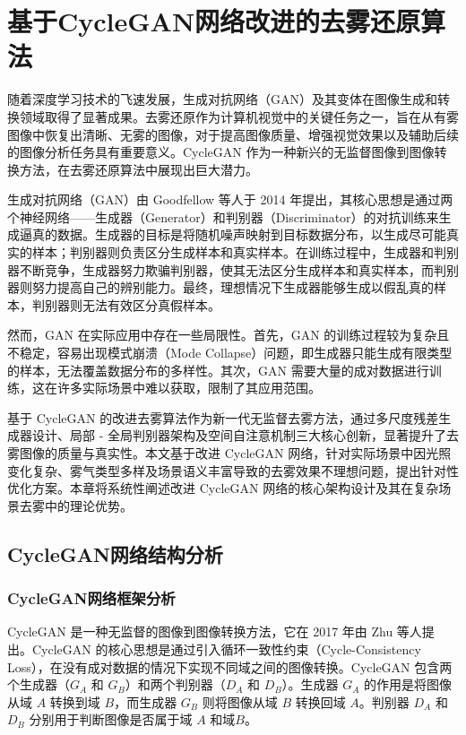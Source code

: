 \section{基于CycleGAN网络改进的去雾还原算法\label{方法A}}

随着深度学习技术的飞速发展，生成对抗网络（GAN）及其变体在图像生成和转换领域取得了显著成果。去雾还原作为计算机视觉中的关键任务之一，旨在从有雾图像中恢复出清晰、无雾的图像，对于提高图像质量、增强视觉效果以及辅助后续的图像分析任务具有重要意义。CycleGAN 作为一种新兴的无监督图像到图像转换方法，在去雾还原算法中展现出巨大潜力。

生成对抗网络（GAN）由 Goodfellow 等人于 2014 年提出，其核心思想是通过两个神经网络——生成器（Generator）和判别器（Discriminator）的对抗训练来生成逼真的数据。生成器的目标是将随机噪声映射到目标数据分布，以生成尽可能真实的样本；判别器则负责区分生成样本和真实样本。在训练过程中，生成器和判别器不断竞争，生成器努力欺骗判别器，使其无法区分生成样本和真实样本，而判别器则努力提高自己的辨别能力。最终，理想情况下生成器能够生成以假乱真的样本，判别器则无法有效区分真假样本。

然而，GAN 在实际应用中存在一些局限性。首先，GAN 的训练过程较为复杂且不稳定，容易出现模式崩溃（Mode Collapse）问题，即生成器只能生成有限类型的样本，无法覆盖数据分布的多样性。其次，GAN 需要大量的成对数据进行训练，这在许多实际场景中难以获取，限制了其应用范围。

基于 CycleGAN 的改进去雾算法作为新一代无监督去雾方法，通过多尺度残差生成器设计、局部 - 全局判别器架构及空间自注意机制三大核心创新，显著提升了去雾图像的质量与真实性。本文基于改进 CycleGAN 网络，针对实际场景中因光照变化复杂、雾气类型多样及场景语义丰富导致的去雾效果不理想问题，提出针对性优化方案。本章将系统性阐述改进 CycleGAN 网络的核心架构设计及其在复杂场景去雾中的理论优势。

\subsection{CycleGAN网络结构分析}

\subsubsection{CycleGAN网络框架分析}

CycleGAN 是一种无监督的图像到图像转换方法，它在 2017 年由 Zhu 等人提出。CycleGAN 的核心思想是通过引入循环一致性约束（Cycle-Consistency Loss），在没有成对数据的情况下实现不同域之间的图像转换。CycleGAN 包含两个生成器（$G_A$ 和 $G_B$）和两个判别器（$D_A$ 和 $D_B$）。生成器 $G_A$ 的作用是将图像从域 $A$ 转换到域 $B$，而生成器 $G_B$ 则将图像从域 $B$ 转换回域 $A$。判别器 $D_A$ 和 $D_B$ 分别用于判断图像是否属于域 $A$ 和域$B$。

